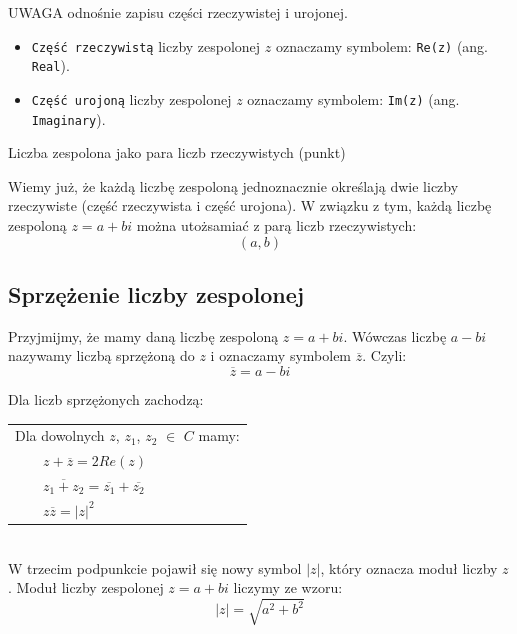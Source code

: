 \documentclass[a4paper,12pt]{article}
\begin{document}
\begin{flushleft}
\textsf{UWAGA} odnośnie zapisu części rzeczywistej i urojonej.
\end{flushleft}
\begin{itemize}
	\item \texttt{Część rzeczywistą} liczby zespolonej $z$ oznaczamy symbolem: \texttt{Re(z)} (ang. \texttt{Real}).
	\item \texttt{Część urojoną} liczby zespolonej $z$ oznaczamy symbolem: \texttt{Im(z)} (ang. \texttt{Imaginary}).
\end{itemize}
\begin{center}
\textsf{Liczba zespolona jako para liczb rzeczywistych (punkt)}
\end{center}

Wiemy już, że każdą liczbę zespoloną jednoznacznie określają dwie liczby rzeczywiste (część rzeczywista i część urojona). W związku z tym, każdą liczbę zespoloną $z=a+bi$ można utożsamiać z parą liczb rzeczywistych:
\begin{equation}
(a,b)
\label{eq:1}
\end{equation}
\cite{matemaks1}

\subsection{Sprzężenie liczby zespolonej}
\label{subsec:SprzezenieLiczbyZespolonej}
Przyjmijmy, że mamy daną liczbę zespoloną $z=a+bi$.
Wówczas liczbę $a-bi$ nazywamy liczbą sprzężoną do $z$ i oznaczamy symbolem $\overline{z}$.
Czyli:
\begin{equation}
\overline{z} = a - bi
\label{eq:2}
\end{equation}

Dla liczb sprzężonych zachodzą:
\\[0.6 cm]
\begin{tabular}{|l|} \hline
Dla dowolnych $z$, $z_{1}$, $z_{2}$ $\in$ $C$ mamy: \\
~~~~$z+\overline{z}=2Re(z)$ \\
~~~~$\overline{z_{1}+z_{2}}=\overline{z_{1}}+\overline{z_{2}}$ \\
~~~~$z\overline{z}=|z|^{2}$ \\ \hline
\end{tabular}
\\[0.6 cm]
W trzecim podpunkcie pojawił się nowy symbol $|z|$, który oznacza moduł liczby $z$.
Moduł liczby zespolonej $z=a+bi$ liczymy ze wzoru:
\begin{equation}
|z|=\sqrt{a^{2}+b^{2}}
\label{eq:3}
\end{equation}
\end{document}
